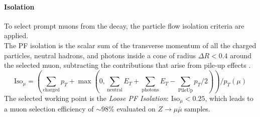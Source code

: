 \paragraph*{Isolation}
To select prompt muons from the \PW decay, the particle flow isolation criteria are applied.
\\
The PF isolation is the scalar sum of the transverse momentum of all the charged particles, neutral hadrons, and photons inside a cone of radius $\Delta R<0.4$ around the selected muon, subtracting the contributions that arise from pile-up effects \cite{2018MuonData}.    
\begin{equation}
    \text{Iso}_\mu = \left(\sum_{\text{charged}} p_T+\max\left(0,\sum_{\text{neutral}}E_T+\sum_{\text{photons}}E_T-\sum_{\text{PileUp}}p_T/2\right)\right)\bigg/p_T(\mu)
\end{equation}
The selected working point is the \emph{Loose PF Isolation}: $\text{Iso}_\mu<0.25$, which leads to a muon selection efficiency of $\sim 98\%$ evaluated on $Z \to \mu \bar{\mu}$ samples.


